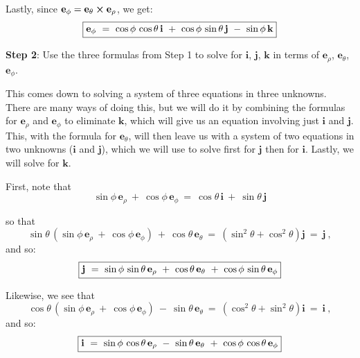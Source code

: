 Lastly, since $\mathbf{e}_{\phi}=\mathbf{e}_{\theta} \bm{\times} \mathbf{e}_{\rho}$, we get:
\begin{displaymath}
 \fbox{$\mathbf{e}_{\phi} ~=~ \cos\phi\,\cos\theta\,\mathbf{i} ~+~ \cos\phi\,\sin\theta\,\mathbf{j} ~-~ \sin\phi\,\mathbf{k}$}
\end{displaymath}

\par\noindent\textbf{Step 2}: Use the three formulas from Step 1 to solve for $\mathbf{i}$, $\mathbf{j}$, $\mathbf{k}$ in
terms of $\mathbf{e}_{\rho}$, $\mathbf{e}_{\theta}$, $\mathbf{e}_{\phi}$.

This comes down to solving a system of three equations in three unknowns. There are many ways of doing this, but we will
do it by combining the formulas for $\mathbf{e}_{\rho}$ and $\mathbf{e}_{\phi}$ to eliminate $\mathbf{k}$, which will give
us an equation involving just $\mathbf{i}$ and $\mathbf{j}$. 
This, with the formula for $\mathbf{e}_{\theta}$, will then
leave us with a system of two equations in two unknowns ($\mathbf{i}$ and $\mathbf{j}$), which we will use to solve
first for $\mathbf{j}$ then for $\mathbf{i}$. 
Lastly, we will solve for $\mathbf{k}$.

First, note that
\begin{displaymath}
 \sin\phi\,\mathbf{e}_{\rho} ~+~ \cos\phi\,\mathbf{e}_{\phi} ~=~ \cos\theta\,\mathbf{i} ~+~ \sin\theta\,\mathbf{j}
\end{displaymath}

\noindent so that
\begin{displaymath}
 \sin\theta\,(\sin\phi\,\mathbf{e}_{\rho} ~+~ \cos\phi\,\mathbf{e}_{\phi}) ~+~ \cos\theta\,\mathbf{e}_{\theta} ~=~
  (\sin^2 \theta + \cos^2 \theta)\mathbf{j} ~=~ \mathbf{j} ~,
\end{displaymath}
and so:
\begin{displaymath}
 \fbox{$\mathbf{j} ~=~ \sin\phi\,\sin\theta\,\mathbf{e}_{\rho} ~+~ \cos\theta\,\mathbf{e}_{\theta} ~+~
  \cos\phi\,\sin\theta\,\mathbf{e}_{\phi}$}
\end{displaymath}

Likewise, we see that
\begin{displaymath}
 \cos\theta\,(\sin\phi\,\mathbf{e}_{\rho} ~+~ \cos\phi\,\mathbf{e}_{\phi}) ~-~ \sin\theta\,\mathbf{e}_{\theta} ~=~
  (\cos^2 \theta + \sin^2 \theta)\mathbf{i} ~=~ \mathbf{i} ~,
\end{displaymath}
and so:
\begin{displaymath}
 \fbox{$\mathbf{i} ~=~ \sin\phi\,\cos\theta\,\mathbf{e}_{\rho} ~-~ \sin\theta\,\mathbf{e}_{\theta} ~+~
  \cos\phi\,\cos\theta\,\mathbf{e}_{\phi}$}
\end{displaymath}

